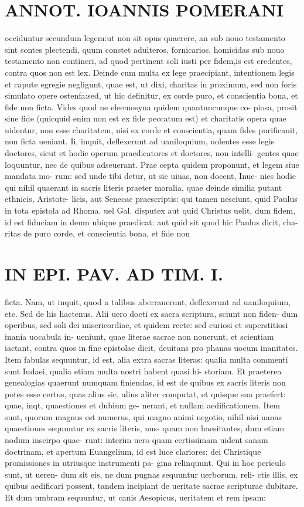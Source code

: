 \documentclass{article}
\begin{document}
\begin{pages}
\section*{ANNOT. IOANNIS POMERANI }\pstart occiduntur secundum legem:ut non sit opus quaerere, an sub nouo testamento sint sontes plectendi, quum constet adulteros, fornicarios, homicidas sub nouo testamento non contineri, ad quod pertinent soli iusti per fidem,is est credentes, contra quos non est lex. Deinde cum multa ex lege praecipiant, intentionem legis et capute egregie negligunt, quae est, ut dixi, charitas in proximum, sed non foris simulato opere ostenfa:sed, ut hic definitur, ex corde puro, et conscientia bona, et fide non ficta. Vides quod ne eleemosyna quidem quantuncunque co- piosa, prosit sine fide (quicquid enim non est ex fide peccatum est) et charitatis opera quae uidentur, non esse charitatem, nisi ex corde et conscientia, quam fides purificauit, non ficta ueniant. Ii, inquit, deflexerunt ad uaniloquium, uolentes esse legis doctores, sicut et hodie operum praedicatores et doctores, non intelli- gentes quae loquuntur, nec de quibus adseuerant. Prae cepta quidem proponunt, et legem siue mandata mo- rum: sed unde tibi detur, ut sic uiuas, non docent, Inue- nies hodie qui nihil quaerant in sacris literis praeter moralia, quae deinde similia putant ethnicis, Aristote- licis, aut Senecae praescriptis: qui tamen nesciunt, quid Paulus in tota epistola ad Rhoma. uel Gal. disputex aut quid Christus uelit, dum fidem, id est fiduciam in deum ubique  praedicat: aut quid sit quod hic Paulus dicit, cha- ritas de puro corde, et conscientia bona, et fide non  \pend
\section*{IN EPI. PAV. AD TIM. I. }
\marginpar{[ p.81 ]}\pstart ficta. Nam, ut inquit, quod a talibus aberrauerunt, deflexerunt ad uaniloquium, etc. Sed de his hactenus. Alii uero docti ex sacra scriptura, sciunt non fiden- dum operibus, sed soli dei misericordiae, et quidem recte: sed curiosi et superstitiosi inania uocabula in- ueniunt, quae literae sacrae non nouerunt, et scientiam iactant, contra quos in fine epistolae dicit, deuitans pro phanas uocum inanitates. Item fabulas sequuntur, id est, alia extra sacras literas: qualia multa commenti sunt Iudaei, qualia etiam multa nostri habent quasi hi- storiam. Et praeterea genealogias quaerunt numquam finiendas, id est de quibus ex sacris literis non potes esse certus, quas alius sic, alius aliter computat, et quisque  sua praefert: quae, inqt, quaestiones et dubium ge- nerant, et nullam aedificationem. Item sunt, quorum magnus est numerus, qui magno animi negotio, nihil nisi uanas quaestiones sequuntur ex sacris literis, nus- quam non haesitantes, dum etiam nodum inscirpo quae- runt: interim uero quam certissimam uident sanam doctrinam, et apertum Euangelium, id est luce clariores: dei Christique  promissiones in utriusque  instrumenti pa- gina relinquunt. Qui in hoc periculo sunt, ut ueren- dum sit eis, ne dum pugnas sequuntur uerborum, reli- ctis illis, ex quibus aedificari possent, tandem incipiant de ueritate sacrae scripturae dubitare. Et dum umbram sequuntur, ut canis Aesopicus, ueritatem et rem ipsam:  \pend

\end{pages}
\end{document}
